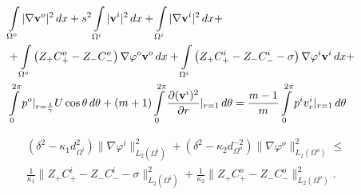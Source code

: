 \documentclass[10pt,a4paper]{amsart}
\begin{document}
\begin{equation}\label{weakvsum}
\begin{aligned}
&\int\limits_{\Omega^o}|\nabla{\bf v}^o|^2\,dx+s^2\int\limits_{\Omega^i}|{\bf v}^i|^2\,dx+\int\limits_{\Omega^i}|\nabla{\bf v}^i|^2\,dx+\\
&+\int\limits_{\Omega^o}\left(Z_{+}C^o_{+}-Z_{-}C^o_{-}\right)\nabla{\varphi^o}{\bf v}^o\,dx+\int\limits_{\Omega^i}\left(Z_{+}C^i_{+}-Z_{-}C^i_{-}-\sigma\right)\nabla{\varphi^i}{\bf v}^i\,dx+\\
&\int\limits_{0}^{2\pi}p^o|_{r=\frac{1}{\gamma}} U\cos\theta\,d\theta+(m+1)\int\limits_{0}^{2\pi}\frac{\partial {({\bf v}^i)^2} }{\partial r}|_{r=1}\,d\theta=\frac{m-1}{m}\int\limits_{0}^{2\pi}p^i{v_r^i}|_{r=1}\,d\theta
\end{aligned}
\end{equation}

 \begin{equation}\label{normsfigradL_2}
\begin{aligned}
&(\delta^2-\kappa_1d^2_{\Omega^i})\|\nabla \varphi^i\|^2_{L_2(\Omega^i)}+(\delta^2-\kappa_2d^{-2}_{\Omega^o})\|\nabla \varphi^o\|^2_{L_2(\Omega^o)}\leq\\
&\frac{1}{\kappa_1}\|Z_{+}C^i_{+}-Z_{-}C^i_{-}-\sigma\|^2_{L_2(\Omega^i)} +\frac{1}{\kappa_2}\|Z_{+}C^o_{+}-Z_{-}C^o_{-}\|^2_{L_2(\Omega^o)}.
\end{aligned}
\end{equation}
\end{document}
